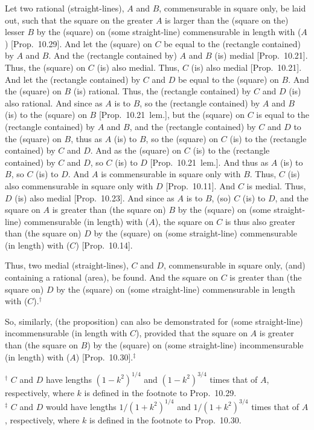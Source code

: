 \begin{Parallel}{}{}
{\epsfysize=1.6in
\centerline{}

Let two rational (straight-lines), $A$ and $B$, commensurable in square only, 
be laid out, such that the square on the greater $A$ is larger than the (square on
the) lesser $B$ by the (square) on (some straight-line) commensurable
in length with ($A$) [Prop.~10.29]. And let the
(square) on $C$ be equal to the (rectangle contained) by $A$ and $B$.
And the (rectangle contained by) $A$ and $B$ (is) medial [Prop.~10.21]. Thus, the (square) on $C$ (is)
also medial. Thus, $C$ (is) also medial [Prop.~10.21]. And let the (rectangle contained) by $C$ and $D$
be equal to the (square) on $B$. And the (square)
on $B$ (is) rational. Thus, the (rectangle contained) by $C$ and $D$ (is)
also rational. And since as $A$ is to $B$, so the (rectangle contained) by
$A$ and $B$ (is) to the (square) on $B$ [Prop.~10.21~lem.], but the (square) on $C$
is equal to the (rectangle contained) by $A$ and $B$,  
and the (rectangle contained) by $C$ and $D$ to the (square) on
$B$, thus as $A$ (is) to $B$,
so the (square) on $C$ (is) to the (rectangle contained) by $C$ and $D$.
And as the (square) on $C$ (is) to the (rectangle contained) by $C$ and $D$,
so $C$ (is) to $D$ [Prop.~10.21~lem.].
And thus as $A$ (is) to $B$, so $C$ (is) to $D$. And $A$ is commensurable
in square only with $B$. Thus, $C$ (is) also commensurable in square
only with $D$ [Prop.~10.11]. And $C$ is medial.
Thus, $D$ (is) also medial [Prop.~10.23]. 
And since as $A$ is to $B$, (so) $C$ (is) to $D$, and the square on $A$
is greater than (the square on) $B$ by the (square) on (some straight-line)
commensurable (in length) with ($A$), the square on $C$
is thus also greater than (the square on) $D$ by the (square) on (some straight-line)
commensurable (in length) with ($C$) [Prop.~10.14]. 

Thus, two medial (straight-lines), $C$ and $D$, 
commensurable in square only, (and) containing a rational (area), be found. And the square on $C$ is greater than (the square on) $D$ by the
(square) on (some straight-line) commensurable in length with ($C$).$^\dag$

So, similarly, (the proposition) can also be demonstrated for  (some straight-line) incommensurable
(in length with $C$), provided that the square on $A$ is greater than (the square on $B$) by the (square) on (some straight-line) incommensurable (in length) with ($A$) [Prop.~10.30].$^\ddag$}
\end{Parallel}
{\footnotesize\noindent$^\dag$ $C$ and $D$ have lengths $(1-k^2)^{1/4}$ and $(1-k^2)^{3/4}$ times that of $A$, respectively, where $k$ is defined in the
footnote to Prop.~10.29.\\[0.5ex]
$^\ddag$ $C$ and $D$ would have lengths $1/(1+k^2)^{1/4}$ and $1/(1+k^2)^{3/4}$ times that of $A$, respectively, where $k$ is defined in the footnote to  Prop.~10.30.}

